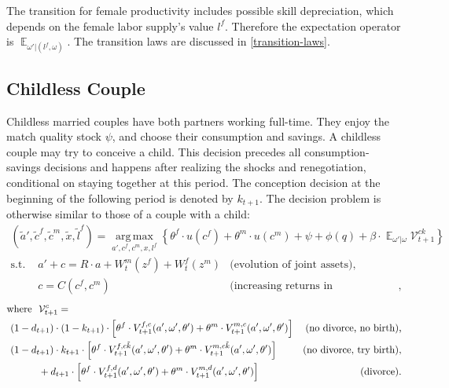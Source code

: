 \documentclass[12pt,letter]{article}
\DeclareMathOperator*{\argmax}{\mathrm{arg\,max}}
\DeclareMathOperator{\E}{\mathbb{E}}
\begin{document}
The transition for female productivity includes possible skill depreciation, which depends on the female labor supply's value $l^f$. Therefore the expectation operator is $\E_{\omega'|(l^f,\omega)}$. The transition laws are discussed in \ref{transition-laws}.

\subsection{Childless Couple}

Childless married couples have both partners working full-time. They enjoy the match quality stock $\psi$, and choose their consumption and savings. A childless couple may try to conceive a child. This decision precedes all consumption-savings decisions and happens after realizing the shocks and renegotiation, conditional on staying together at this period. The conception decision at the beginning of the following period is denoted by $k_{t+1}$. The decision problem is otherwise similar to those of a couple with a child:
\begin{align}(\tilde a',\tilde c^f,\tilde c^m,\tilde x,\tilde l^f)  = \argmax\limits_{a',c^f,c^m,x,l^f} \left\{\theta^f \cdot u(c^f) + \theta^m\cdot u(c^m) + \psi + \phi(q) + \beta\cdot \E_{\omega'|\omega} \mathcal{V}^{ck}_{t+1}\right\}
 \end{align}
\vspace{-2em}
\begin{align*}
\text{s.t. \ } & a' + c = R\cdot a  + W^m_t(z^f) + W^f_t(z^m) & \text{(evolution of joint assets)},\\
                    & c =C(c^f,c^m) & \text{(increasing returns in consumption)},
\end{align*}
\vspace{-2em}
\begin{align*}
\text{where \ } &   \mathcal{V}^{c}_{t+1} = \\
&  \hspace{-1cm} (1-d_{t+1})\cdot (1-k_{t+1})\cdot  \left[ \theta^f \cdot V^{f,c}_{t+1}(a',\omega',\theta') +  \theta^m \cdot V^{m,c}_{t+1}(a',\omega',\theta')\right]  & \text{(no divorce, no birth),} \\
&\hspace{-1cm} (1-d_{t+1})\cdot k_{t+1}\cdot  \left[ \theta^f \cdot V^{f,c\tilde{k}}_{t+1}(a',\omega',\theta') +  \theta^m \cdot V^{m,c\tilde{k}}_{t+1}(a',\omega',\theta')\right]  & \text{(no divorce, try birth),} \\
& + d_{t+1}\cdot  \left[ \theta^f \cdot V^{f,d}_{t+1}(a',\omega',\theta') +  \theta^m \cdot V^{m,d}_{t+1}(a',\omega',\theta')\right] & \text{(divorce).}
\end{align*}
\end{document}
